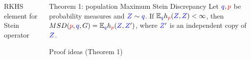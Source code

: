\begin{frame}
\begin{columns}
\begin{column}{.33\linewidth}
\begin{block}{RKHS element for Stein operator}
\vspace{0.5cm}
\end{block}

\vspace{-0.75cm}



 


\end{column}

\hspace{-1.45cm}
\begin{column}{.33\linewidth}


\begin{block}{Theorem 1: population Maximum Stein Discrepancy}
\large
Let ${ \color{blue} q},{\color{red} p}$ be probability measures and ${ \color{blue} Z}\sim { \color{blue} q}$. 
If $\mathbb{E}_{{ \color{blue} q}} h_{{\color{red} p}}({ \color{blue} Z},{ \color{blue} Z})<\infty$, then 
$MSD({\color{red} p},{ \color{blue} q},G) = \mathbb{E}_{{ \color{blue} q}} h_{{\color{red} p}}({ \color{blue} Z},{ \color{blue} Z}')$,
where ${ \color{blue} Z}'$ is an independent copy of ${ \color{blue} Z}$.
\end{block}

\vspace{-0.73cm}
\begin{block}{Proof ideas (Theorem 1)}


\end{block}
\end{column}
\end{columns}
\end{frame}
